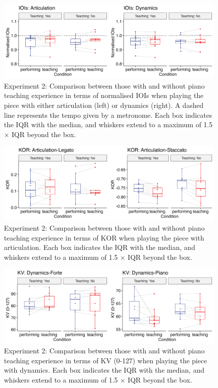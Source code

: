 \documentclass[
  man,floatsintext]{apa6}
\begin{document}
\begin{figure}
\includegraphics[width=1\linewidth]{manuscript_files/figure-latex/plot-ioi-teaching-2-1} \caption{\label{fig:ioi-teaching-2}Experiment 2: Comparison between those with and without piano teaching experience in terms of normalised IOIs when playing the piece with either articulation (left) or dynamics (right). A dashed line represents the tempo given by a metronome. Each box indicates the IQR with the median, and whiskers extend to a maximum of 1.5 × IQR beyond the box.}\label{fig:plot-ioi-teaching-2}
\end{figure}

\begin{figure}
\includegraphics[width=1\linewidth]{manuscript_files/figure-latex/plot-art-teaching-2-1} \caption{\label{fig:art-teaching-2}Experiment 2:  Comparison between those with and without piano teaching experience in terms of KOR when playing the piece with articulation. Each box indicates the IQR with the median, and whiskers extend to a maximum of 1.5 × IQR beyond the box.}\label{fig:plot-art-teaching-2}
\end{figure}

\begin{figure}
\includegraphics[width=1\linewidth]{manuscript_files/figure-latex/plot-dyn-teaching-2-1} \caption{\label{fig:dyn-teaching-2}Experiment 2: Comparison between those with and without piano teaching experience in terms of KV (0-127) when playing the piece with dynamics. Each box indicates the IQR with the median, and whiskers extend to a maximum of 1.5 × IQR beyond the box.}\label{fig:plot-dyn-teaching-2}
\end{figure}
\end{document}

